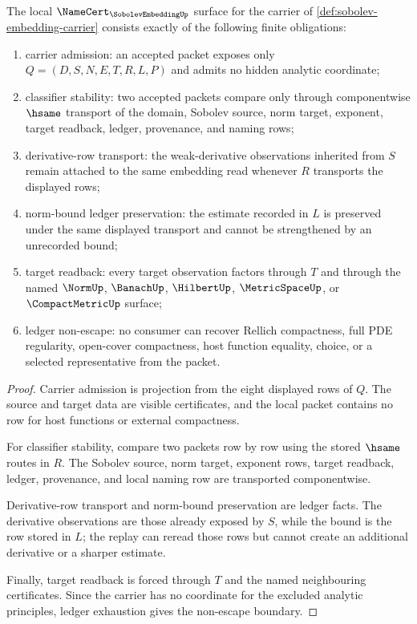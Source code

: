 \begin{theorem}
\label{thm:sobolev-embedding-namecert-obligations}
The local $\NameCert_{\SobolevEmbeddingUp}$ surface for the carrier of \autoref{def:sobolev-embedding-carrier} consists exactly of the following finite obligations:
\begin{enumerate}
\item carrier admission: an accepted packet exposes only $Q=(D,S,N,E,T,R,L,P)$ and admits no hidden analytic coordinate;
\item classifier stability: two accepted packets compare only through componentwise $\hsame$ transport of the domain, Sobolev source, norm target, exponent, target readback, ledger, provenance, and naming rows;
\item derivative-row transport: the weak-derivative observations inherited from $S$ remain attached to the same embedding read whenever $R$ transports the displayed rows;
\item norm-bound ledger preservation: the estimate recorded in $L$ is preserved under the same displayed transport and cannot be strengthened by an unrecorded bound;
\item target readback: every target observation factors through $T$ and through the named $\NormUp$, $\BanachUp$, $\HilbertUp$, $\MetricSpaceUp$, or $\CompactMetricUp$ surface;
\item ledger non-escape: no consumer can recover Rellich compactness, full PDE regularity, open-cover compactness, host function equality, choice, or a selected representative from the packet.
\end{enumerate}
\end{theorem}
\begin{proof}
Carrier admission is projection from the eight displayed rows of $Q$. The source and target data are visible certificates, and the local packet contains no row for host functions or external compactness.

For classifier stability, compare two packets row by row using the stored $\hsame$ routes in $R$. The Sobolev source, norm target, exponent rows, target readback, ledger, provenance, and local naming row are transported componentwise.

Derivative-row transport and norm-bound preservation are ledger facts. The derivative observations are those already exposed by $S$, while the bound is the row stored in $L$; the replay can reread those rows but cannot create an additional derivative or a sharper estimate.

Finally, target readback is forced through $T$ and the named neighbouring certificates. Since the carrier has no coordinate for the excluded analytic principles, ledger exhaustion gives the non-escape boundary.
\end{proof}


